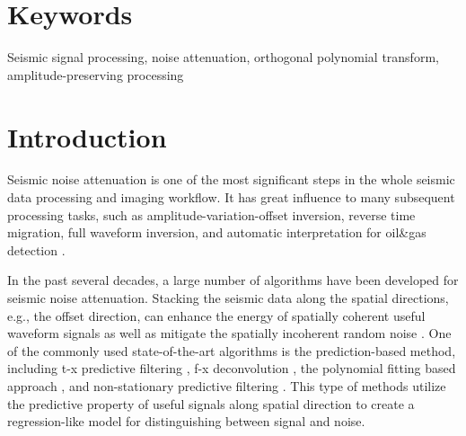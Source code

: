 \section{Keywords}
Seismic signal processing, noise attenuation, orthogonal polynomial transform, amplitude-preserving processing


\maketitle



\section{Introduction}
Seismic noise attenuation is one of the most significant steps in the whole seismic data processing and imaging workflow. It has great influence to many subsequent processing tasks, such as amplitude-variation-offset inversion, reverse time migration, full waveform inversion, and automatic interpretation for oil\&gas detection \cite[]{huang2016,gao2016,zhiguang2016seg1,zhiguang2016seg2,benfengpocs,shuwei2016vscan,zeng2017fluid,asgedom2017rough,qushan2017eage,zhang2017quantitative,yangkang2018gji}. 

In the past several decades, a large number of algorithms have been developed for seismic noise attenuation. Stacking the seismic data along the spatial directions, e.g., the offset direction, can enhance the energy of spatially coherent useful waveform signals as well as mitigate the spatially incoherent random noise \cite[]{guochang2009,jianyong2016eage2,wujuan2018jge1}. One of the commonly used state-of-the-art algorithms is the prediction-based method, including t-x predictive filtering \cite[]{abma1995}, f-x deconvolution \cite[]{canales1984}, the polynomial fitting based approach \cite[]{guochang20112}, and non-stationary predictive filtering \cite[]{guochang2012,guochang2013}.  This type of methods utilize the predictive property of useful signals along spatial direction to create a regression-like model for distinguishing between signal and noise. 

